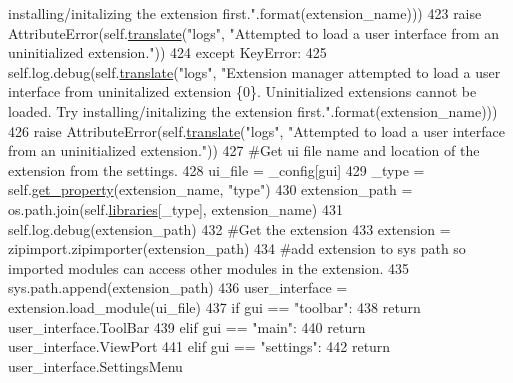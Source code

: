 \begin{DoxyCode}
{       installing/initalizing the extension first."}.format(extension\_name)))
423                 \textcolor{keywordflow}{raise} AttributeError(self.\hyperlink{classcommotion__client_1_1utils_1_1extension__manager_1_1ExtensionManager_a2cfd032ca383c3fd6f0f52b99b6dd67c}{translate}(\textcolor{stringliteral}{"logs"}, \textcolor{stringliteral}{"Attempted to load a user interface
       from an uninitialized extension."}))
424         \textcolor{keywordflow}{except} KeyError:
425             self.log.debug(self.\hyperlink{classcommotion__client_1_1utils_1_1extension__manager_1_1ExtensionManager_a2cfd032ca383c3fd6f0f52b99b6dd67c}{translate}(\textcolor{stringliteral}{"logs"}, \textcolor{stringliteral}{"Extension manager attempted to load a user
       interface from uninitalized extension \{0\}. Uninitialized extensions cannot be loaded. Try installing/initalizing
       the extension first."}.format(extension\_name)))
426             \textcolor{keywordflow}{raise} AttributeError(self.\hyperlink{classcommotion__client_1_1utils_1_1extension__manager_1_1ExtensionManager_a2cfd032ca383c3fd6f0f52b99b6dd67c}{translate}(\textcolor{stringliteral}{"logs"}, \textcolor{stringliteral}{"Attempted to load a user interface from
       an uninitialized extension."}))
427         \textcolor{comment}{#Get ui file name and location of the extension from the settings.}
428         ui\_file = \_config[gui]
429         \_type = self.\hyperlink{classcommotion__client_1_1utils_1_1extension__manager_1_1ExtensionManager_a91552f94535d729789bcb7da471d90fe}{get\_property}(extension\_name, \textcolor{stringliteral}{"type"})
430         extension\_path = os.path.join(self.\hyperlink{classcommotion__client_1_1utils_1_1extension__manager_1_1ExtensionManager_a28e035496b4d544179f934b3c401c0c1}{libraries}[\_type], extension\_name)
431         self.log.debug(extension\_path)
432         \textcolor{comment}{#Get the extension}
433         extension = zipimport.zipimporter(extension\_path)
434         \textcolor{comment}{#add extension to sys path so imported modules can access other modules in the extension.}
435         sys.path.append(extension\_path)
436         user\_interface = extension.load\_module(ui\_file)
437         \textcolor{keywordflow}{if} gui == \textcolor{stringliteral}{"toolbar"}:
438             \textcolor{keywordflow}{return} user\_interface.ToolBar
439         \textcolor{keywordflow}{elif} gui == \textcolor{stringliteral}{"main"}:
440             \textcolor{keywordflow}{return} user\_interface.ViewPort
441         \textcolor{keywordflow}{elif} gui == \textcolor{stringliteral}{"settings"}:
442             \textcolor{keywordflow}{return} user\_interface.SettingsMenu

\end{DoxyCode}
